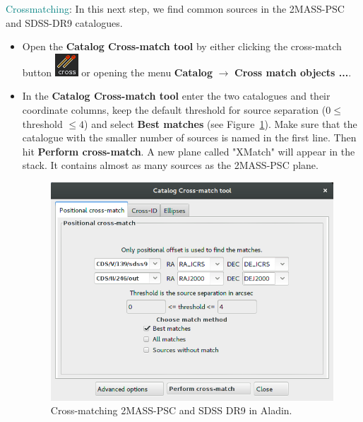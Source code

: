 \documentclass [a4paper, 12pt]{article}
\newcommand{\aladin}{{\textsc{A}{ladin}}}
\begin{document}
\noindent \textcolor{teal}{Crossmatching}: In this next step, we find common 
sources in 
the 2MASS-PSC and SDSS-DR9 catalogues. 
\begin{itemize}
    \item Open the \textbf{Catalog Cross-match tool} by either clicking the 
    cross-match button \includegraphics[width=0.03 
    \textwidth]{../images/aladin_button_crossmatch.png} or opening the menu 
    \textbf{Catalog} $\rightarrow$ \textbf{Cross match objects ...}. 
    \item In the \textbf{Catalog Cross-match tool} enter the two catalogues and 
    their coordinate columns, keep the default threshold for source separation 
    ($0 \le $ threshold $\le 4$) and select \textbf{Best matches} (see 
    Figure~\ref{fig:crossmatch_2mass_sdss_aladin}). Make sure 
    that the catalogue with the smaller number of sources is named in the first 
    line. Then hit \textbf{Perform cross-match}. A new plane called "XMatch" 
    will appear in the stack. It contains almost as many sources as the 
    2MASS-PSC plane. 
    \begin{figure}[H]
        \center
        \includegraphics[width=0.5 
        \textwidth]{../images/aladin_crossmatch_sdss-2mass.png}
        \caption{Cross-matching 2MASS-PSC and SDSS DR9 in \aladin.}
        \label{fig:crossmatch_2mass_sdss_aladin}
    \end{figure}
\end{itemize}
\end{document}
